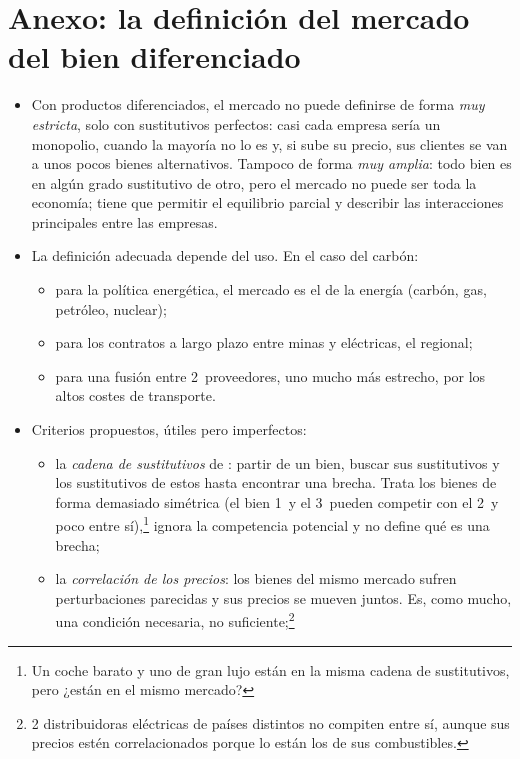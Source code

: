 \documentclass[11pt]{article}
\begin{document}
\section{Anexo: la definición del mercado del bien diferenciado}\label{anexo:mercado-relevante}

\begin{itemize}
\item Con productos diferenciados, el mercado no puede definirse de forma \emph{muy estricta}, solo con sustitutivos perfectos: casi cada empresa sería un monopolio, cuando la mayoría no lo es y, si sube su precio, sus clientes se van a unos pocos bienes alternativos. Tampoco de forma \emph{muy amplia}: todo bien es en algún grado sustitutivo de otro, pero el mercado no puede ser toda la economía; tiene que permitir el equilibrio parcial y describir las interacciones principales entre las empresas\nocite{Tirole1988Theory}.
\item La definición adecuada depende del uso. En el caso del carbón\nocite{Tirole1988Theory}:
  \begin{itemize}
  \item para la política energética, el mercado es el de la energía (carbón, gas, petróleo, nuclear);
  \item para los contratos a largo plazo entre minas y eléctricas, el regional;
  \item para una fusión entre 2~proveedores, uno mucho más estrecho, por los altos costes de transporte.
  \end{itemize}
\item Criterios propuestos, útiles pero imperfectos:
  \begin{itemize}
  \item la \emph{cadena de sustitutivos} de \textcite{Robinson1933Economics}: partir de un bien, buscar sus sustitutivos y los sustitutivos de estos hasta encontrar una brecha. Trata los bienes de forma demasiado simétrica (el bien 1~y el 3~pueden competir con el 2~y poco entre sí),\footnote{Un coche barato y uno de gran lujo están en la misma cadena de sustitutivos, pero ¿están en el mismo mercado?} ignora la competencia potencial y no define qué es una brecha;
  \item la \emph{correlación de los precios}: los bienes del mismo mercado sufren perturbaciones parecidas y sus precios se mueven juntos. Es, como mucho, una condición necesaria, no suficiente;\footnote{2 distribuidoras eléctricas de países distintos no compiten entre sí, aunque sus precios estén correlacionados porque lo están los de sus combustibles.}

\end{itemize}
\end{itemize}
\end{document}
